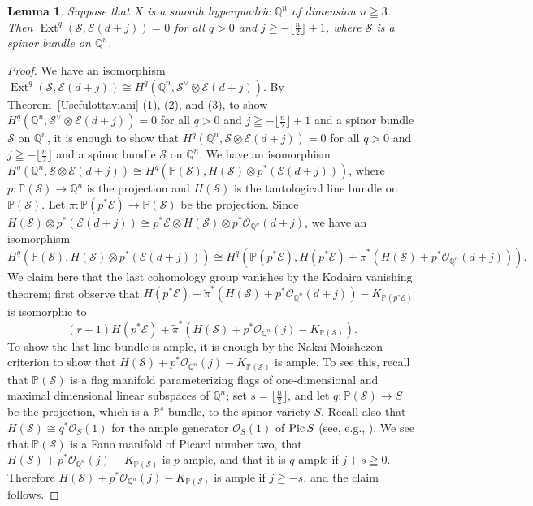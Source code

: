 \documentclass[a4paper,12pt]{amsart}
\newtheorem{lemma}[thm]{Lemma}%
\newcommand{\Pic}{\mathop{\rm Pic}\nolimits}
\DeclareMathOperator{\Ext}{Ext}
\begin{document}
\begin{lemma}\label{KodairaOnQuadric}
Suppose that $X$ is a smooth hyperquadric $\mathbb{Q}^n$ of dimension $n\geqq 3$.
Then 
$\Ext^q(\mathcal{S},\mathcal{E}(d+j))=0$ for all $q>0$ and $j\geqq -\lfloor\frac{n}{2}\rfloor+1$,
where $\mathcal{S}$ is a 
spinor bundle on $\mathbb{Q}^n$.
\end{lemma}
\begin{proof}
We have an isomorphism $\Ext^q(\mathcal{S},\mathcal{E}(d+j))\cong 
H^q(\mathbb{Q}^n, \mathcal{S}^{\vee}\otimes\mathcal{E}(d+j))$.
By Theorem~\ref{Usefulottaviani} (1), (2), and (3),
to show $H^q(\mathbb{Q}^n,\mathcal{S}^{\vee}\otimes\mathcal{E}(d+j))=0$
for all $q>0$ and $j\geqq -\lfloor\frac{n}{2}\rfloor+1$ and 
a 
spinor bundle $\mathcal{S}$ on $\mathbb{Q}^n$,
it is enough to show that $H^q(\mathbb{Q}^n,\mathcal{S}\otimes\mathcal{E}(d+j))=0$
for all $q>0$ and $j\geqq -\lfloor\frac{n}{2}\rfloor$ and 
a 
spinor bundle $\mathcal{S}$ on $\mathbb{Q}^n$.
We have an isomorphism $H^q(\mathbb{Q}^n,\mathcal{S}\otimes\mathcal{E}(d+j))\cong 
H^q(\mathbb{P}(\mathcal{S}), H(\mathcal{S})\otimes p^*(\mathcal{E}(d+j)))$,
where $p:\mathbb{P}(\mathcal{S})\to \mathbb{Q}^n$ is the projection
and $H(\mathcal{S})$ is the tautological line bundle
on $\mathbb{P}(\mathcal{S})$.
Let $\tilde{\pi}:\mathbb{P}(p^*\mathcal{E})\to \mathbb{P}(\mathcal{S})$ be the projection.
Since $H(\mathcal{S})\otimes p^*(\mathcal{E}(d+j))\cong 
p^*\mathcal{E}\otimes H(\mathcal{S})\otimes p^*\mathcal{O}_{\mathbb{Q}^n}(d+j)$,
we have an isomorphism
\[H^q(\mathbb{P}(\mathcal{S}), H(\mathcal{S})\otimes p^*(\mathcal{E}(d+j)))
\cong
H^q(\mathbb{P}(p^*\mathcal{E}), H(p^*\mathcal{E})
+
\tilde{\pi}^*(H(\mathcal{S})
+
p^*\mathcal{O}_{\mathbb{Q}^n}(d+j))).\]
We claim here that the last cohomology group vanishes by the Kodaira vanishing theorem;
first observe that 
$H(p^*\mathcal{E})+
\tilde{\pi}^*(H(\mathcal{S})+ p^*\mathcal{O}_{\mathbb{Q}^n}(d+j))-K_{\mathbb{P}(p^*\mathcal{E})}
$ is isomorphic to 
\[(r+1)H(p^*\mathcal{E})+
\tilde{\pi}^*(H(\mathcal{S})+ p^*\mathcal{O}_{\mathbb{Q}^n}(j)-K_{\mathbb{P}(\mathcal{S})}).\]
To show the last line bundle is ample, it is enough by the Nakai-Moishezon criterion to show that 
$H(\mathcal{S})+ p^*\mathcal{O}_{\mathbb{Q}^n}(j)-K_{\mathbb{P}(\mathcal{S})}$ is ample.
To see this, recall that $\mathbb{P}(\mathcal{S})$ is a flag manifold
parameterizing flags of one-dimensional and maximal dimensional linear subspaces
of $\mathbb{Q}^n$; set $s=\lfloor \frac{n}{2}\rfloor$, and let $q:\mathbb{P}(\mathcal{S})\to S$ be the projection,
which is a $\mathbb{P}^{s}$-bundle, to the spinor variety $S$.
Recall also that $H(\mathcal{S})\cong q^*\mathcal{O}_S(1)$
for the ample generator $\mathcal{O}_S(1)$ of $\Pic S$ (see, e.g., \cite[\S 5]{MR3275418}).
We see that $\mathbb{P}(\mathcal{S})$ is a Fano manifold of Picard number two,
that $H(\mathcal{S})+ p^*\mathcal{O}_{\mathbb{Q}^n}(j)-K_{\mathbb{P}(\mathcal{S})}$ is $p$-ample,
and that it is $q$-ample if $j+s\geqq 0$. Therefore $H(\mathcal{S})+ p^*\mathcal{O}_{\mathbb{Q}^n}(j)-K_{\mathbb{P}(\mathcal{S})}$
is ample if $j\geqq -s$, and the claim follows.
\end{proof}
\end{document}
